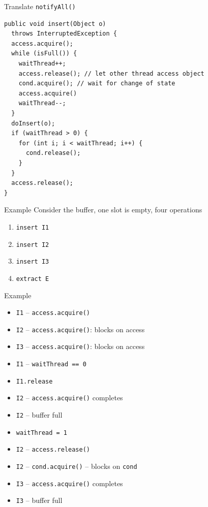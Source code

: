 \begin{frame}[fragile]{Translate \lstinline!notifyAll()!}
\begin{lstlisting}[basicstyle=\fontsize{9}{11}\selectfont\ttfamily]
public void insert(Object o) 
  throws InterruptedException {
  access.acquire();
  while (isFull()) {
    waitThread++;
    access.release(); // let other thread access object
    cond.acquire(); // wait for change of state
    access.acquire()
    waitThread--;
  }
  doInsert(o);	
  if (waitThread > 0) { 
    for (int i; i < waitThread; i++) {
      cond.release(); 
    } 
  }
  access.release(); 
}
\end{lstlisting}
\end{frame}

\begin{frame}{Example}
  Consider the buffer, one slot is empty, four operations


  \begin{enumerate}
  \item \lstinline!insert I1!
  \item \lstinline!insert I2!
  \item \lstinline!insert I3!
  \item \lstinline!extract E!
  \end{enumerate}
\end{frame}

\begin{frame}{Example}
  \begin{itemize}
  \item \lstinline!I1! -- \lstinline!access.acquire()!
  \item \lstinline!I2! -- \lstinline!access.acquire()!: blocks on
    access
  \item \lstinline!I3! -- \lstinline!access.acquire()!: blocks on
    access
  \item \lstinline!I1! -- \lstinline!waitThread == 0!
  \item \lstinline!I1.release!
  \item \lstinline!I2! -- \lstinline!access.acquire()! completes
  \item \lstinline!I2! -- buffer full
  \item \lstinline!waitThread = 1!
  \item \lstinline!I2! -- \lstinline!access.release()!
  \item \lstinline!I2! -- \lstinline!cond.acquire()! -- blocks on \lstinline!cond!
  \item \lstinline!I3! -- \lstinline!access.acquire()! completes
  \item \lstinline!I3! -- buffer full
  \end{itemize}
\end{frame}

